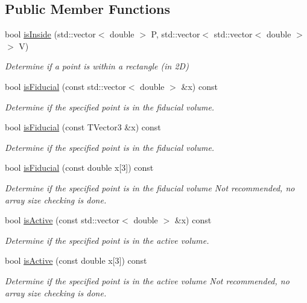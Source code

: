 \subsection*{Public Member Functions}
\begin{DoxyCompactItemize}
\item 
bool \hyperlink{group__lee_ga4d4f0303130ac496452b30f60f43f5f1}{is\-Inside} (std\-::vector$<$ double $>$ P, std\-::vector$<$ std\-::vector$<$ double $>$ $>$ V)
\begin{DoxyCompactList}\small\item\em Determine if a point is within a rectangle (in 2\-D) \end{DoxyCompactList}\item 
bool \hyperlink{group__lee_ga6d02792fc6869b86d850077460536b2a}{is\-Fiducial} (const std\-::vector$<$ double $>$ \&x) const 
\begin{DoxyCompactList}\small\item\em Determine if the specified point is in the fiducial volume. \end{DoxyCompactList}\item 
bool \hyperlink{group__lee_ga5383a8e03c66e9506a75d9afc41f5ff0}{is\-Fiducial} (const T\-Vector3 \&x) const 
\begin{DoxyCompactList}\small\item\em Determine if the specified point is in the fiducial volume. \end{DoxyCompactList}\item 
bool \hyperlink{group__lee_gae10d0ef387b7573c6cc12565d5bfd0e1}{is\-Fiducial} (const double x\mbox{[}3\mbox{]}) const 
\begin{DoxyCompactList}\small\item\em Determine if the specified point is in the fiducial volume Not recommended, no array size checking is done. \end{DoxyCompactList}\item 
bool \hyperlink{group__lee_gaaa423d79bbb62bdd3337f1d965023baa}{is\-Active} (const std\-::vector$<$ double $>$ \&x) const 
\begin{DoxyCompactList}\small\item\em Determine if the specified point is in the active volume. \end{DoxyCompactList}\item 
bool \hyperlink{group__lee_gab5c3e840d748f5c5340315b6c096e7c8}{is\-Active} (const double x\mbox{[}3\mbox{]}) const 
\begin{DoxyCompactList}\small\item\em Determine if the specified point is in the active volume Not recommended, no array size checking is done. \end{DoxyCompactList}\item 

\end{DoxyCompactItemize}

